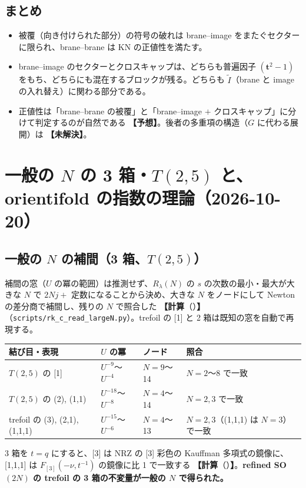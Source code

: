 \documentclass[a4paper,10pt]{ltjsarticle}
\newcommand{\bt}{\bm{t}}
\newcommand{\comp}[1]{\textbf{【計算}\if\relax\detokenize{#1}\relax\else（#1）\fi\textbf{】}}
\newcommand{\conj}{\textbf{【予想】}}
\newcommand{\open}{\textbf{【未解決】}}
\begin{document}
\subsection{まとめ}
\begin{itemize}
\item 被覆（向き付けられた部分）の符号の破れは brane--image をまたぐセクターに限られ、brane--brane は KN の正値性を満たす。
\item brane--image のセクターとクロスキャップは、どちらも普遍因子 $(\bt^2 - 1)$ をもち、どちらにも混在するブロックが残る。どちらも $\tilde I$（brane と image の入れ替え）に関わる部分である。
\item 正値性は「brane--brane の被覆」と「brane--image $+$ クロスキャップ」に分けて判定するのが自然である \conj。後者の多重項の構造（$G$ に代わる展開）は \open。
\end{itemize}

\section{一般の $N$ の 3 箱・$T(2,5)$ と、orientifold の指数の理論（2026-10-20）}\label{sec:threebox}
\subsection{一般の $N$ の補間（3 箱、$T(2,5)$）}
補間の窓（$U$ の冪の範囲）は推測せず、$R_\lambda(N)$ の $s$ の次数の最小・最大が大きな $N$ で $2N j + $ 定数になることから決め、大きな $N$ をノードにして Newton の差分商で補間し、残りの $N$ で照合した \comp{}（\texttt{scripts/rk\_c\_read\_largeN.py}）。trefoil の [1] と 2 箱は既知の窓を自動で再現する。
\begin{center}
\begin{tabular}{llll}
\toprule
結び目・表現 & $U$ の冪 & ノード & 照合 \\
\midrule
$T(2,5)$ の [1] & $U^{-9}$〜$U^{-4}$ & $N = 9$〜14 & $N = 2$〜8 で一致 \\
$T(2,5)$ の (2), (1,1) & $U^{-18}$〜$U^{-8}$ & $N = 4$〜14 & $N = 2, 3$ で一致 \\
trefoil の (3), (2,1), (1,1,1) & $U^{-15}$〜$U^{-6}$ & $N = 4$〜13 & $N = 2, 3$（(1,1,1) は $N = 3$）で一致 \\
\bottomrule
\end{tabular}
\end{center}
3 箱を $t = q$ にすると、[3] は NRZ の [3] 彩色の Kauffman 多項式の鏡像に、[1,1,1] は $F_{[3]}(-\nu, t^{-1})$ の鏡像に比 1 で一致する \comp{}。\textbf{refined SO$(2N)$ の trefoil の 3 箱の不変量が一般の $N$ で得られた。}
\end{document}
